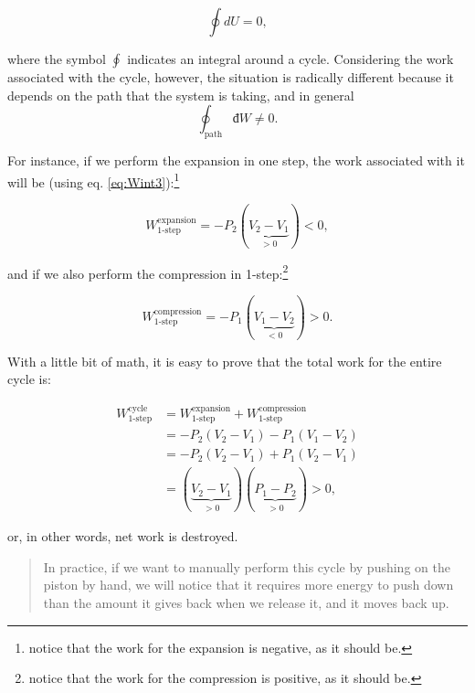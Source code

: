 \documentclass[
  9pt,
]{extbook}
\theoremstyle{definition}
\theoremstyle{definition}
\theoremstyle{definition}
\theoremstyle{definition}
\theoremstyle{remark}
\begin{document}
\begin{equation}
  \oint dU=0,
  \label{eq:de0}
\end{equation}

where the symbol \(\oint\) indicates an integral around a cycle. Considering the work associated with the cycle, however, the situation is radically different because it depends on the path that the system is taking, and in general
\begin{equation}
\oint_{\text{path}} đW \neq 0.
  \label{eq:dw0}
\end{equation}

For instance, if we perform the expansion in one step, the work associated with it will be (using eq. \eqref{eq:Wint3}):\footnote{notice that the work for the expansion is negative, as it should be.}

\begin{equation}
  W^{\text{expansion}}_{\text{1-step}}=-P_2(\underbrace{V_2-V_1}_{>0})<0,
  \label{eq:Wexp1}
\end{equation}

and if we also perform the compression in 1-step:\footnote{notice that the work for the compression is positive, as it should be.}

\begin{equation}
  W^{\text{compression}}_{\text{1-step}}=-P_1(\underbrace{V_1-V_2}_{<0})>0.
  \label{eq:Wcomp1}
\end{equation}

With a little bit of math, it is easy to prove that the total work for the entire cycle is:

\begin{equation}
\begin{aligned}
W^{\text{cycle}}_{\text{1-step}} {} & =  W^{\text{expansion}}_{\text{1-step}}+W^{\text{compression}}_{\text{1-step}} \\
 & = -P_2(V_2-V_1)-P_1(V_1-V_2) \\
 & = -P_2(V_2-V_1)+P_1(V_2-V_1) \\
 & = (\underbrace{V_2-V_1}_{>0})(\underbrace{P_1-P_2}_{>0}) > 0,
\end{aligned}
  \label{eq:Wtot1}
\end{equation}

or, in other words, net work is destroyed.

\begin{quote}
In practice, if we want to manually perform this cycle by pushing on the piston by hand, we will notice that it requires more energy to push down than the amount it gives back when we release it, and it moves back up.
\end{quote}
\end{document}
